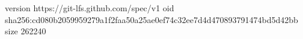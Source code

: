 version https://git-lfs.github.com/spec/v1
oid sha256:cd080b2059959279a1f2faa50a25ae0ef74c32ee7d4d470893791474bd5d42bb
size 262240
